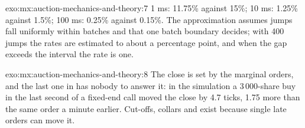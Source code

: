 \begin{solution}{exo:mx:auction-mechanics-and-theory:7}
1 ms: 11.75\% against 15\%; 10 ms: 1.25\% against 1.5\%; 100 ms: 0.25\% against 0.15\%. The approximation assumes jumps fall uniformly within batches
and that one batch boundary decides; with 400 jumps the rates are estimated to about a percentage point, and when the gap exceeds the interval the rate
is one.
\end{solution}

\begin{solution}{exo:mx:auction-mechanics-and-theory:8}
The close is set by the marginal orders, and the last one in has nobody to answer it: in the simulation a 3\,000-share buy in the last second of a
fixed-end call moved the close by 4.7 ticks, 1.75 more than the same order a minute earlier. Cut-offs, collars and  exist because single late
orders can move it.
\end{solution}

